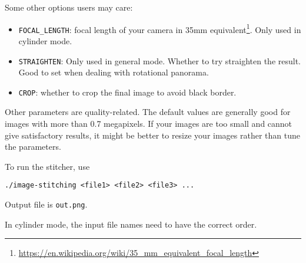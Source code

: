
Some other options users may care:
\begin{itemize}
    \item \verb|FOCAL_LENGTH|: focal length of your camera in
      35mm equivalent\footnote{\url{https://en.wikipedia.org/wiki/35_mm_equivalent_focal_length}}. Only used in cylinder mode.
    \item \verb|STRAIGHTEN|: Only used in general mode. Whether to try straighten the result. Good to set when dealing with rotational panorama.
    \item \verb|CROP|: whether to crop the final image to avoid black border.
\end{itemize}

Other parameters are quality-related.
The default values are generally good for images with more than 0.7 megapixels.
If your images are too small and cannot give satisfactory results,
it might be better to resize your images rather than tune the parameters.


To run the stitcher, use
\begin{lstlisting}
./image-stitching <file1> <file2> <file3> ...
\end{lstlisting}

Output file is \verb|out.png|.


In cylinder mode, the input file names need to have the correct order.

